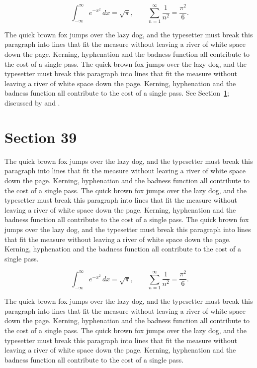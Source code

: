 \documentclass{article}
\begin{document}
\begin{equation}\label{eq:38}
\int_{-\infty}^{\infty} e^{-x^{2}}\,dx = \sqrt{\pi}, \qquad
\sum_{n=1}^{\infty} \frac{1}{n^{2}} = \frac{\pi^{2}}{6}.
\end{equation}

The quick brown fox jumps over the lazy dog, and the typesetter must break this paragraph into lines that fit the measure without leaving a river of white space down the page. Kerning, hyphenation and the badness function all contribute to the cost of a single pass. The quick brown fox jumps over the lazy dog, and the typesetter must break this paragraph into lines that fit the measure without leaving a river of white space down the page. Kerning, hyphenation and the badness function all contribute to the cost of a single pass. 
See Section~\ref{sec:39}; discussed by \textcite{k4} and \textcite{l1}.
\section{Section 39}
\label{sec:39}
The quick brown fox jumps over the lazy dog, and the typesetter must break this paragraph into lines that fit the measure without leaving a river of white space down the page. Kerning, hyphenation and the badness function all contribute to the cost of a single pass. The quick brown fox jumps over the lazy dog, and the typesetter must break this paragraph into lines that fit the measure without leaving a river of white space down the page. Kerning, hyphenation and the badness function all contribute to the cost of a single pass. The quick brown fox jumps over the lazy dog, and the typesetter must break this paragraph into lines that fit the measure without leaving a river of white space down the page. Kerning, hyphenation and the badness function all contribute to the cost of a single pass. 

\begin{equation}\label{eq:39}
\int_{-\infty}^{\infty} e^{-x^{2}}\,dx = \sqrt{\pi}, \qquad
\sum_{n=1}^{\infty} \frac{1}{n^{2}} = \frac{\pi^{2}}{6}.
\end{equation}

The quick brown fox jumps over the lazy dog, and the typesetter must break this paragraph into lines that fit the measure without leaving a river of white space down the page. Kerning, hyphenation and the badness function all contribute to the cost of a single pass. The quick brown fox jumps over the lazy dog, and the typesetter must break this paragraph into lines that fit the measure without leaving a river of white space down the page. Kerning, hyphenation and the badness function all contribute to the cost of a single pass. 
\end{document}

